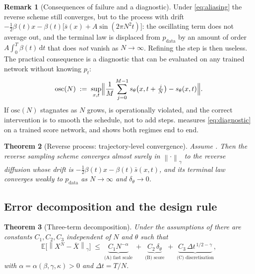\documentclass[a4paper,fleqn]{cas-dc}
\newtheorem{theorem}{Theorem}[section]
\theoremstyle{definition}
\newtheorem{remark}[theorem]{Remark}
\newcommand{\E}{\mathbb{E}}
\newcommand{\norm}[1]{\left\lVert#1\right\rVert}
\newcommand{\holder}[1]{\norm{#1}_{\gamma}}
\newcommand{\dd}{\,\mathrm{d}}
\begin{document}
\begin{remark}[Consequences of failure and a diagnostic]
\label{rem:H-fail-consequence}
Under \eqref{eq:aliasing} the reverse scheme still converges, but to the process with
drift $-\tfrac12\beta(t)x-\beta(t)\bigl[\bar s(x)+A\sin(2\pi N^{2}t)\bigr]$: the
oscillating term does not average out, and the terminal law is displaced from
$p_{\mathrm{data}}$ by an amount of order $A\int_{0}^{T}\beta(t)\dd t$ that does
\emph{not} vanish as $N\to\infty$. Refining the step is then useless.
The practical consequence is a diagnostic that can be evaluated on any trained
network without knowing $p_{t}$:
\begin{equation}
\mathrm{osc}(N)\;:=\;\sup_{x,t}\Bigl\lVert\frac{1}{M}\sum_{j=0}^{M-1}
s_{\theta}\!\left(x,t+\tfrac{j}{N}\right)-s_{\theta}(x,t)\Bigr\rVert .
\label{eq:diagnostic}
\end{equation}
If $\mathrm{osc}(N)$ stagnates as $N$ grows,  is operationally
violated, and the correct intervention is to smooth the schedule, not to add
steps.  measures \eqref{eq:diagnostic} on a trained score
network, and  shows both regimes end to end.
\end{remark}

\begin{theorem}[Reverse process: trajectory-level convergence]
\label{thm:reverse}
Assume . Then the reverse sampling
scheme converges almost surely in $\holder{\cdot}$ to the reverse diffusion whose drift
is $-\tfrac12\beta(t)x-\beta(t)\bar s(x,t)$, and its terminal law converges weakly to
$p_{\mathrm{data}}$ as $N\to\infty$ and $\delta_{\theta}\to0$.
\end{theorem}

\subsection{Error decomposition and the design rule}

\begin{theorem}[Three-term decomposition]
\label{thm:decomp}
Under the assumptions of  there are constants $C_{1},C_{2},C_{3}$
independent of $N$ and $\theta$ such that
\begin{equation}
\E\bigl[\holder{X^{N}-\bar X}\bigr]
\;\le\; \underbrace{C_{1}N^{-\alpha}}_{\text{(A) fast scale}}
\;+\; \underbrace{C_{2}\,\delta_{\theta}}_{\text{(B) score}}
\;+\; \underbrace{C_{3}\,\Delta t^{\,1/2-\gamma}}_{\text{(C) discretisation}},
\label{eq:decomp}
\end{equation}
with $\alpha=\alpha(\beta,\gamma,\kappa)>0$ and $\Delta t = T/N$.
\end{theorem}
\end{document}

